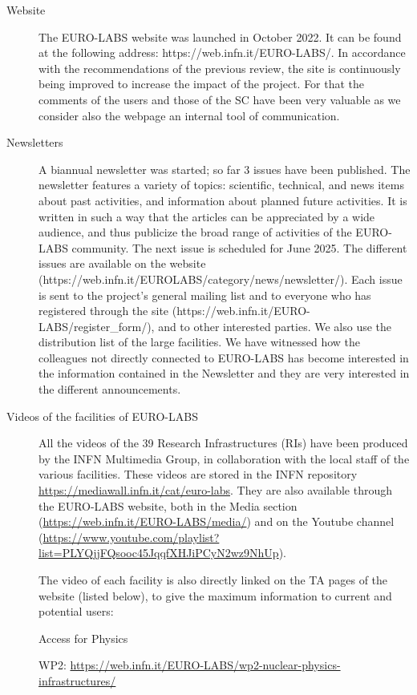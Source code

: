 \begin{description}

\item[Website] The EURO-LABS website was launched in October 2022. It can be found at the following address: https://web.infn.it/EURO-LABS/. In accordance with the recommendations of the previous review, the site is continuously being improved to increase the impact of the project. For that the comments of the users and those of the SC have been very valuable as we consider also the webpage an internal tool of communication.

\item[Newsletters] A biannual newsletter was started; so far 3 issues have been published. The newsletter features a variety of topics: scientific, technical, and news items about past activities, and information about planned future activities. It is written in such a way that the articles can be appreciated by a wide audience, and thus publicize the broad range of activities of the EURO-LABS community. The next issue is scheduled for June 2025. The different issues are available on the website (https://web.infn.it/EUROLABS/category/news/newsletter/). Each issue is sent to the project's general mailing list and to everyone who has registered through the site (https://web.infn.it/EURO-LABS/register\_form/), and to other interested parties. We also use the distribution list of the large facilities. We have witnessed how the colleagues not directly connected to EURO-LABS has become interested in the information contained in the Newsletter and they are very interested in the different announcements.

\item[Videos of the facilities of EURO-LABS] All the videos of the 39 Research Infrastructures (RIs) have been produced by the INFN Multimedia Group, in collaboration with the local staff of the various facilities. These videos are stored in the INFN repository \url{https://mediawall.infn.it/cat/euro-labs}. They are also available through the EURO-LABS website, both in the Media section (\url{https://web.infn.it/EURO-LABS/media/}) and on the Youtube channel (\url{https://www.youtube.com/playlist?list=PLYQjjFQsooc45JqqfXHJiPCyN2wz9NhUp}).
 
The video of each facility is also directly linked on the TA pages of the website (listed below), to give the maximum information to current and potential users:

Access for Physics

WP2: \url{https://web.infn.it/EURO-LABS/wp2-nuclear-physics-infrastructures/}


\end{description}
